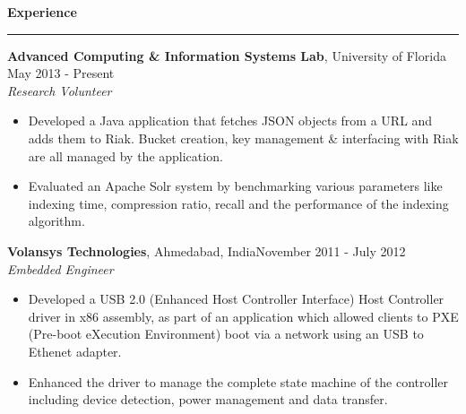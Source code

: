 \documentclass[10pt]{article}
\begin{document}
\textbf{Experience}
\smallskip
\hrule
{\bf Advanced Computing \& Information Systems Lab}, University of Florida \hfill May 2013 - Present\\
\textit{Research Volunteer}
\begin{itemize}
    \item Developed a Java application that fetches JSON objects from a URL and adds them to Riak. Bucket creation, key management \& interfacing with Riak are all managed by the application. %
    \item Evaluated an Apache Solr system by benchmarking various parameters like indexing time, compression ratio, recall and the performance of the indexing algorithm.
\end{itemize}
{\bf Volansys Technologies}, Ahmedabad, India\hfill November 2011 - July 2012\\
\textit{Embedded Engineer}
\begin{itemize}
    \item Developed a USB 2.0 (Enhanced Host Controller Interface) Host Controller driver in x86 assembly, as part of an application which allowed clients to PXE (Pre-boot eXecution Environment) boot via a network using an USB to Ethenet adapter. 
    \item Enhanced the driver to manage the complete state machine of the controller including device detection, power management and data transfer. %
\end{itemize}
\end{document}
